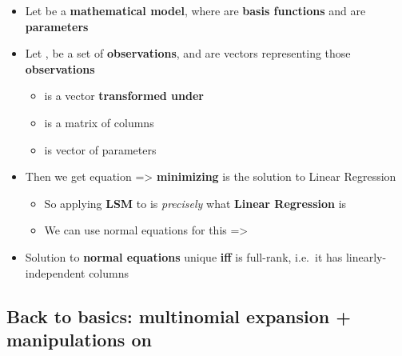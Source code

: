 \begin{itemize}

\item
  Let  be a
  \textbf{mathematical model}, where  are \textbf{basis
  functions} and  are \textbf{parameters}
\item
  Let ,  be a
  set of \textbf{observations}, and
   are vectors
  representing those \textbf{observations}

  \begin{itemize}
  
  \item
     is
    a vector \textbf{transformed under} 
  \item
    is a matrix of columns
  \item
     is vector of
    parameters
  \end{itemize}
\item
  Then we get equation  =\textgreater{}
  \textbf{minimizing}
   is the
  solution to Linear Regression

  \begin{itemize}
  
  \item
    So applying \textbf{LSM} to  is
    \emph{precisely} what \textbf{Linear Regression} is
  \item
    We can use normal equations for this =\textgreater{}
  \end{itemize}
\item
  Solution to \textbf{normal equations} unique \textbf{iff}  is
  full-rank, i.e.~it has linearly-independent columns
\end{itemize}

\subsection*{\texorpdfstring{Back to basics: multinomial expansion +
manipulations on
\iMbox{\sum/\prod}}{Back to basics: multinomial expansion + manipulations on }}

